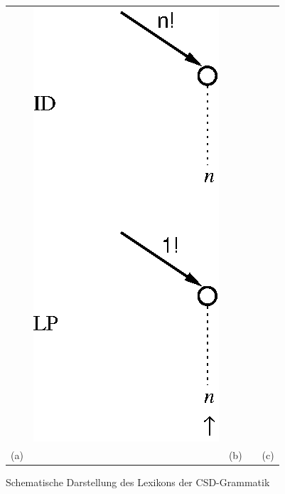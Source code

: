 \begin{figure}
\begin{tabular}{c c c c c}
\vspace{1cm} &
\includegraphics[scale=0.7]{eps/csd_n_fig}   \\
(a) & & (b) & & (c)
\end{tabular}
\caption{Schematische Darstellung des Lexikons der CSD-Grammatik}
\label{csdlexicon}
\end{figure} 

